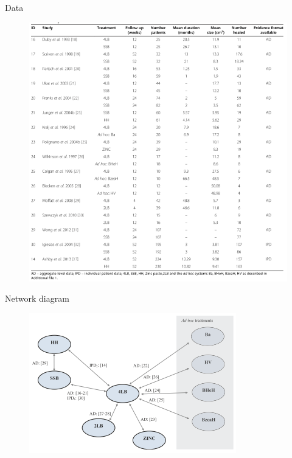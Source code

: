 \documentclass[
  ignorenonframetext,
]{beamer}
\begin{document}
\begin{frame}{Data}
\protect\hypertarget{data}{}
\begin{figure}

{\centering \includegraphics{paper-table.png}

}

\end{figure}
\end{frame}

\begin{frame}{Network diagram}
\protect\hypertarget{network-diagram}{}
\begin{figure}

{\centering \includegraphics{paper-network-diagram.png}

}

\end{figure}
\end{frame}
\end{document}
